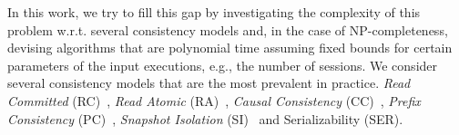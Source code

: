 In this work, we try to fill this gap by investigating the complexity of this problem w.r.t. several consistency models and, in the case of NP-completeness, devising algorithms that are polynomial time assuming fixed bounds for certain parameters of the input executions, e.g., the number of sessions. We consider several consistency models that are the most prevalent in practice. \emph{Read Committed} (RC)~\cite{DBLP:conf/sigmod/BerensonBGMOO95}, \emph{Read Atomic} (RA)~\cite{DBLP:conf/concur/Cerone0G15},  \emph{Causal Consistency} (CC)~\cite{DBLP:journals/cacm/Lamport78}, \emph{Prefix Consistency} (PC)~\cite{DBLP:conf/ecoop/BurckhardtLPF15}, \emph{Snapshot Isolation} (SI)~\cite{DBLP:conf/sigmod/BerensonBGMOO95} and Serializability (SER).

%
%
%
%
